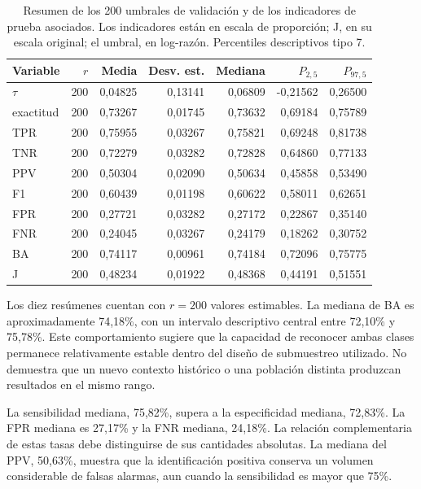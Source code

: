\documentclass[11pt,a4paper]{article}
\begin{document}
\begin{table}[H]
\centering
\caption[Resumen de los 200 umbrales de validación y de los indicadores de prueba asociados.]{Resumen de los 200 umbrales de validación y de los indicadores de prueba asociados. Los indicadores están en escala de proporción; J, en su escala original; el umbral, en log-razón. Percentiles descriptivos tipo 7.}\label{tab:resumen}
\small
\setlength{\tabcolsep}{4pt}
\begin{tabular}{lrrrrrr}
\toprule
Variable & $r$ & Media & Desv. est. & Mediana & $P_{2,5}$ & $P_{97,5}$ \\
\midrule
$\tau$ & 200 & 0,04825 & 0,13141 & 0,06809 & -0,21562 & 0,26500 \\
exactitud & 200 & 0,73267 & 0,01745 & 0,73632 & 0,69184 & 0,75789 \\
TPR & 200 & 0,75955 & 0,03267 & 0,75821 & 0,69248 & 0,81738 \\
TNR & 200 & 0,72279 & 0,03282 & 0,72828 & 0,64860 & 0,77133 \\
PPV & 200 & 0,50304 & 0,02090 & 0,50634 & 0,45858 & 0,53490 \\
F1 & 200 & 0,60439 & 0,01198 & 0,60622 & 0,58011 & 0,62651 \\
FPR & 200 & 0,27721 & 0,03282 & 0,27172 & 0,22867 & 0,35140 \\
FNR & 200 & 0,24045 & 0,03267 & 0,24179 & 0,18262 & 0,30752 \\
BA & 200 & 0,74117 & 0,00961 & 0,74184 & 0,72096 & 0,75775 \\
J & 200 & 0,48234 & 0,01922 & 0,48368 & 0,44191 & 0,51551 \\
\bottomrule
\end{tabular}
\end{table}

Los diez resúmenes cuentan con $r=200$ valores estimables. La mediana de BA es aproximadamente 74,18\%, con un intervalo descriptivo central entre 72,10\% y 75,78\%. Este comportamiento sugiere que la capacidad de reconocer ambas clases permanece relativamente estable dentro del diseño de submuestreo utilizado. No demuestra que un nuevo contexto histórico o una población distinta produzcan resultados en el mismo rango.

La sensibilidad mediana, 75,82\%, supera a la especificidad mediana, 72,83\%. La FPR mediana es 27,17\% y la FNR mediana, 24,18\%. La relación complementaria de estas tasas debe distinguirse de sus cantidades absolutas. La mediana del PPV, 50,63\%, muestra que la identificación positiva conserva un volumen considerable de falsas alarmas, aun cuando la sensibilidad es mayor que 75\%.
\end{document}
